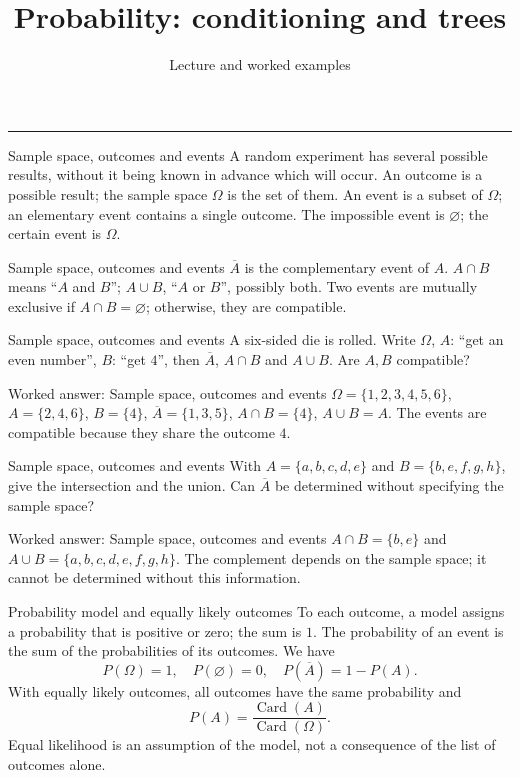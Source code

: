 \documentclass[aspectratio=169,10pt]{beamer}
\title{Probability: conditioning and trees}
\subtitle{Lecture and worked examples}
\date{}
\author{}
\providecommand{\Card}{\operatorname{Card}}
\begin{document}
\begin{frame}[plain]
\vfill
{\inserttitle\par}
\medskip
{\insertsubtitle\par}
\medskip
{\rule{\textwidth}{.5pt}}
\vfill
\end{frame}
\begin{frame}{Sample space, outcomes and events}
A random experiment has several possible results, without it being known in advance which will occur. An outcome is a possible result; the sample space \(\Omega\) is the set of them. An event is a subset of \(\Omega\); an elementary event contains a single outcome.
The impossible event is \(\varnothing\); the certain event is \(\Omega\).
\end{frame}
\begin{frame}{Sample space, outcomes and events}
\(\overline A\) is the complementary event of \(A\). \(A\cap B\) means “\(A\) and \(B\)”; \(A\cup B\), “\(A\) or \(B\)”, possibly both. Two events are mutually exclusive if \(A\cap B=\varnothing\); otherwise, they are compatible.
\end{frame}
\begin{frame}{Sample space, outcomes and events}
A six-sided die is rolled. Write \(\Omega\), \(A\): “get an even number”, \(B\): “get \(4\)”, then \(\overline A\), \(A\cap B\) and \(A\cup B\). Are \(A,B\) compatible?
\end{frame}
\begin{frame}{Worked answer: Sample space, outcomes and events}
\(\Omega=\{1,2,3,4,5,6\}\), \(A=\{2,4,6\}\), \(B=\{4\}\), \(\overline A=\{1,3,5\}\), \(A\cap B=\{4\}\), \(A\cup B=A\). The events are compatible because they share the outcome \(4\).
\end{frame}
\begin{frame}{Sample space, outcomes and events}
With \(A=\{a,b,c,d,e\}\) and \(B=\{b,e,f,g,h\}\), give the intersection and the union. Can \(\overline A\) be determined without specifying the sample space?
\end{frame}
\begin{frame}{Worked answer: Sample space, outcomes and events}
\(A\cap B=\{b,e\}\) and \(A\cup B=\{a,b,c,d,e,f,g,h\}\). The complement depends on the sample space; it cannot be determined without this information.
\end{frame}
\begin{frame}{Probability model and equally likely outcomes}
To each outcome, a model assigns a probability that is positive or zero; the sum is \(1\). The probability of an event is the sum of the probabilities of its outcomes. We have
\[P(\Omega)=1,\quad P(\varnothing)=0,\quad P(\overline A)=1-P(A).\]
With equally likely outcomes, all outcomes have the same probability and
\[P(A)=\dfrac{\Card(A)}{\Card(\Omega)}.\]
Equal likelihood is an assumption of the model, not a consequence of the list of outcomes alone.
\end{frame}
\end{document}
